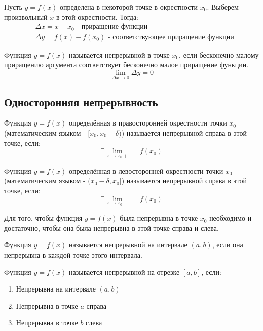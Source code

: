 Пусть $y = f(x)$ определена в некоторой точке в окрестности $x_0$.
Выберем произвольный $x$ в этой окрестности.
Тогда:
\begin{align*}
  &\boxed{\Delta x = x - x_0} \text{ - приращение функции} \\
  &\boxed{\Delta y = f(x) - f(x_0)} \text{ - соответствующее приращение функции}
\end{align*}


\begin{definition}
  Функция $y = f(x)$ называется непрерывной в точке $x_0$, если бесконечно малому приращению аргумента соответствует бесконечно малое приращение функции. \[
    \lim_{\Delta x \to 0} \Delta y = 0
  \] 
\end{definition}

\subsection{Односторонняя непрерывность}

\begin{definition}
  Функция $y = f(x)$ определённая в правосторонней окрестности точки $x_0$ (математическим языком - $[x_0, x_0 + \delta)$) называется непрерывной справа в этой точке, если: \[
  \exists \lim_{x \to x_0+} = f(x_0)
  \] 
\end{definition}

\begin{definition}
  Функция $y = f(x)$ определённая в левосторонней окрестности точки $x_0$ (математическим языком - $(x_0 - \delta, x_0]$) называется непрерывной справа в этой точке, если: \[
  \exists \lim_{x \to x_0-} = f(x_0)
  \] 
\end{definition}

\begin{theorem}
  Для того, чтобы функция $y = f(x)$ была непрерывна в точке $x_0$ необходимо и достаточно, чтобы она была непрерывна в этой точке справа и слева. 
\end{theorem}

\begin{definition}
  Функция $y = f(x)$ называется непрерывной на интервале $(a, b)$, если она непрерывна в каждой точке этого интервала.
\end{definition}

\begin{definition}
  Функция $y = f(x) $ называется непрерывной на отрезке $[a, b]$, если:
  \begin{enumerate}
    \item Непрерывна на интервале $(a, b)$
    \item Непрерывна в точке $a$ справа
    \item Непрерывна в точке $b$ слева
  \end{enumerate}
\end{definition}

